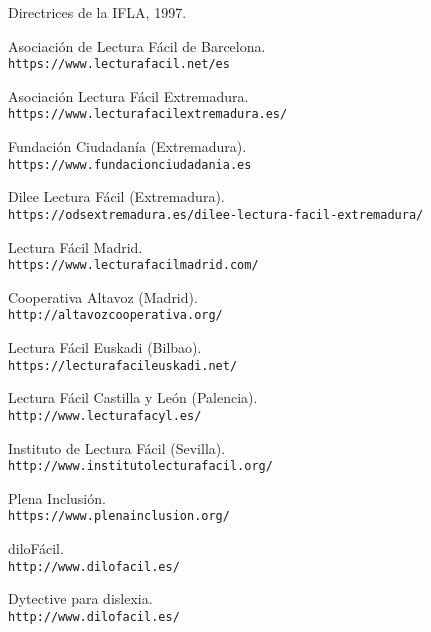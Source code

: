 \begin{thebibliography}{}

Directrices de la IFLA, 1997. 

Asociación de Lectura Fácil de Barcelona. 
\\\texttt{https://www.lecturafacil.net/es}

Asociación Lectura Fácil Extremadura. 
\\\texttt{https://www.lecturafacilextremadura.es/}

Fundación Ciudadanía (Extremadura). 
\\\texttt{https://www.fundacionciudadania.es}

Dilee Lectura Fácil (Extremadura). 
\\\texttt{https://odsextremadura.es/dilee-lectura-facil-extremadura/}

Lectura Fácil Madrid. 
\\\texttt{https://www.lecturafacilmadrid.com/}

Cooperativa Altavoz (Madrid). 
\\\texttt{http://altavozcooperativa.org/}

Lectura Fácil Euskadi (Bilbao). 
\\\texttt{https://lecturafacileuskadi.net/}

Lectura Fácil Castilla y León (Palencia). 
\\\texttt{http://www.lecturafacyl.es/}

Instituto de Lectura Fácil (Sevilla). 
\\\texttt{http://www.institutolecturafacil.org/}

Plena Inclusión. 
\\\texttt{https://www.plenainclusion.org/}

diloFácil. 
\\\texttt{http://www.dilofacil.es/}



Dytective para dislexia.
\\\texttt{http://www.dilofacil.es/}

\end{thebibliography}





